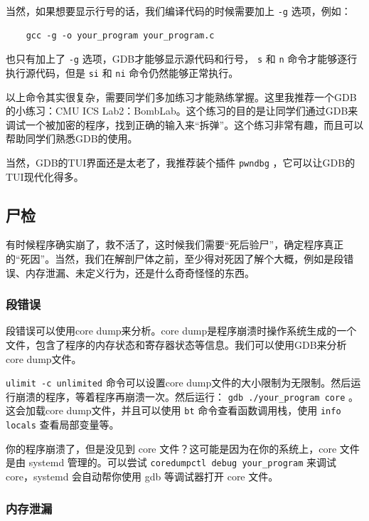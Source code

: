 当然，如果想要显示行号的话，我们编译代码的时候需要加上 \texttt{-g} 选项，例如：
\begin{verbatim}
    gcc -g -o your_program your_program.c
\end{verbatim}
也只有加上了 \texttt{-g} 选项，GDB才能够显示源代码和行号， \texttt{s} 和 \texttt{n} 命令才能够逐行执行源代码，但是 \texttt{si} 和 \texttt{ni} 命令仍然能够正常执行。

以上命令其实很复杂，需要同学们多加练习才能熟练掌握。这里我推荐一个GDB的小练习：CMU ICS Lab2：BombLab。这个练习的目的是让同学们通过GDB来调试一个被加密的程序，找到正确的输入来“拆弹”。这个练习非常有趣，而且可以帮助同学们熟悉GDB的使用。

当然，GDB的TUI界面还是太老了，我推荐装个插件 \texttt{pwndbg} ，它可以让GDB的TUI现代化得多。

\subsection{尸检}

有时候程序确实崩了，救不活了，这时候我们需要“死后验尸”，确定程序真正的“死因”。当然，我们在解剖尸体之前，至少得对死因了解个大概，例如是段错误、内存泄漏、未定义行为，还是什么奇奇怪怪的东西。

\subsubsection{段错误}

段错误可以使用core dump来分析。core dump是程序崩溃时操作系统生成的一个文件，包含了程序的内存状态和寄存器状态等信息。我们可以使用GDB来分析core dump文件。

 \texttt{ulimit -c unlimited} 命令可以设置core dump文件的大小限制为无限制。然后运行崩溃的程序，等着程序再崩溃一次。然后运行： \texttt{gdb ./your\_program core} 。这会加载core dump文件，并且可以使用 \texttt{bt} 命令查看函数调用栈，使用 \texttt{info locals} 查看局部变量等。

 \begin{note}
 你的程序崩溃了，但是没见到 core 文件？这可能是因为在你的系统上，core 文件是由 systemd 管理的。可以尝试 \texttt{coredumpctl debug your\_program} 来调试 core，systemd 会自动帮你使用 gdb 等调试器打开 core 文件。
 \end{note}

\subsubsection{内存泄漏}

